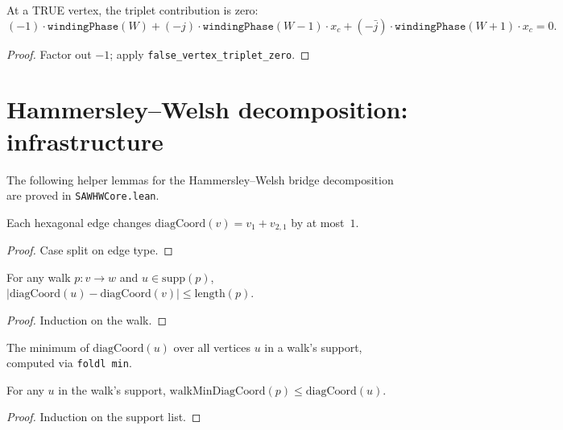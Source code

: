 \begin{lemma}
\begin{lemma}\label{lem:true_vertex_triplet}
\leanok
{}
  At a TRUE vertex, the triplet contribution is zero:
  \[
    (-1) \cdot \texttt{windingPhase}(W)
    + (-j) \cdot \texttt{windingPhase}(W{-}1) \cdot x_c
    + (-\bar{j}) \cdot \texttt{windingPhase}(W{+}1) \cdot x_c = 0.
  \]
\end{lemma}
\begin{proof}
\leanok
  Factor out $-1$; apply \texttt{false\_vertex\_triplet\_zero}.
\end{proof}

\section{Hammersley--Welsh decomposition: infrastructure}\label{sec:hw_infra}

The following helper lemmas for the Hammersley--Welsh bridge decomposition
are proved in \texttt{SAWHWCore.lean}.

\begin{lemma}\label{lem:diag_step}
\leanok
  Each hexagonal edge changes $\mathrm{diagCoord}(v) = v_1 + v_{2,1}$
  by at most~$1$.
\end{lemma}
\begin{proof}\leanok Case split on edge type.\end{proof}

\begin{lemma}\label{lem:walk_diag_bound}
\leanok
{}
  For any walk $p: v \to w$ and $u \in \mathrm{supp}(p)$,
  $|\mathrm{diagCoord}(u) - \mathrm{diagCoord}(v)| \leq \mathrm{length}(p)$.
\end{lemma}
\begin{proof}\leanok Induction on the walk.\end{proof}

\begin{definition}\label{def:walk_min_diag}
\leanok
  The minimum of $\mathrm{diagCoord}(u)$ over all vertices $u$ in
  a walk's support, computed via \texttt{foldl min}.
\end{definition}

\begin{lemma}\label{lem:min_diag_le}
\leanok
{}
  For any $u$ in the walk's support,
  $\mathrm{walkMinDiagCoord}(p) \leq \mathrm{diagCoord}(u)$.
\end{lemma}
\begin{proof}\leanok Induction on the support list.\end{proof}


\end{lemma}
